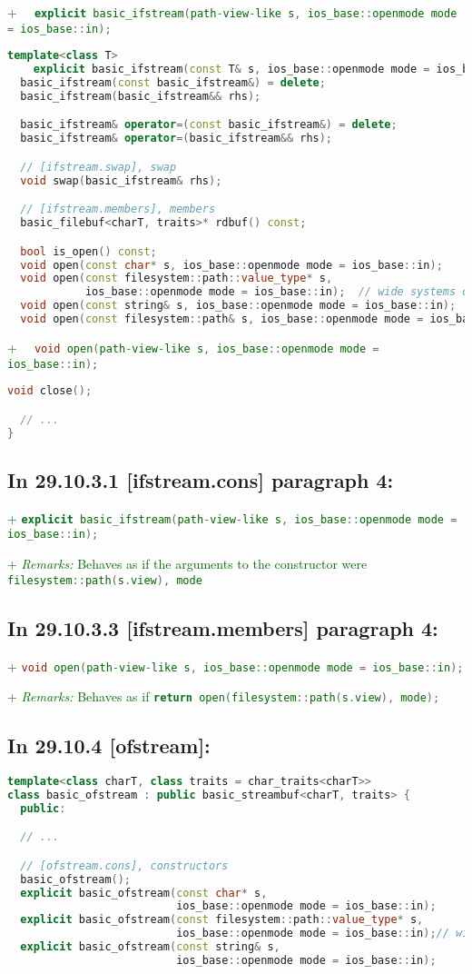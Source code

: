 \documentclass[11pt]{article}
\newcommand{\code}[2][cpp]{\lstinline[language=#1,basicstyle=\small\ttfamily]{#2}}
\newcommand{\desc}[1]{\textit{#1}}
\newcommand{\remarks}{\desc{Remarks: }}
\newcommand{\tsrefp}[3]{\subsection*{In #2 \textbf{[#1]} paragraph #3:}}
\newcommand{\tsref}[2]{\subsection*{In #2 \textbf{[#1]}:}}
\newcommand{\tsreplace}[3]{\textcolor{red}{\sout{#1}}#2\textcolor{darkgreen}{#3}}
\begin{document}
\tsreplace{}{}{+ \code{  explicit basic_ifstream(path-view-like s,
ios_base::openmode mode = ios_base::in);}}

\begin{lstlisting}[language=cpp]
  template<class T>
    explicit basic_ifstream(const T& s, ios_base::openmode mode = ios_base::in);
  basic_ifstream(const basic_ifstream&) = delete;
  basic_ifstream(basic_ifstream&& rhs);

  basic_ifstream& operator=(const basic_ifstream&) = delete;
  basic_ifstream& operator=(basic_ifstream&& rhs);

  // [ifstream.swap], swap
  void swap(basic_ifstream& rhs);

  // [ifstream.members], members
  basic_filebuf<charT, traits>* rdbuf() const;

  bool is_open() const;
  void open(const char* s, ios_base::openmode mode = ios_base::in);
  void open(const filesystem::path::value_type* s,
            ios_base::openmode mode = ios_base::in);  // wide systems only; see [fstream.syn]
  void open(const string& s, ios_base::openmode mode = ios_base::in);
  void open(const filesystem::path& s, ios_base::openmode mode = ios_base::in);
\end{lstlisting}

\tsreplace{}{}{+ \code{  void open(path-view-like s, ios_base::openmode mode = ios_base::in);}}

\begin{lstlisting}[language=cpp]
  void close();

  // ...
}
\end{lstlisting}

\tsrefp{ifstream.cons}{29.10.3.1}{4}

\tsreplace{}{}{+ \code{explicit basic_ifstream(path-view-like s,
ios_base::openmode mode = ios_base::in);}}

\tsreplace{}{}{+ \remarks Behaves as if the arguments to the constructor were \code{filesystem::path(s.view), mode}}

\tsrefp{ifstream.members}{29.10.3.3}{4}

\tsreplace{}{}{+ \code{void open(path-view-like s, ios_base::openmode mode = ios_base::in);}}

\tsreplace{}{}{+ \remarks Behaves as if \code{return open(filesystem::path(s.view), mode);}}


\tsref{ofstream}{29.10.4}

\begin{lstlisting}[language=cpp]
template<class charT, class traits = char_traits<charT>>
class basic_ofstream : public basic_streambuf<charT, traits> {
  public:

  // ...

  // [ofstream.cons], constructors
  basic_ofstream();
  explicit basic_ofstream(const char* s,
                          ios_base::openmode mode = ios_base::in);
  explicit basic_ofstream(const filesystem::path::value_type* s,
                          ios_base::openmode mode = ios_base::in);// wide systems only; see [fstream.syn]
  explicit basic_ofstream(const string& s,
                          ios_base::openmode mode = ios_base::in);
\end{lstlisting}
\end{document}
